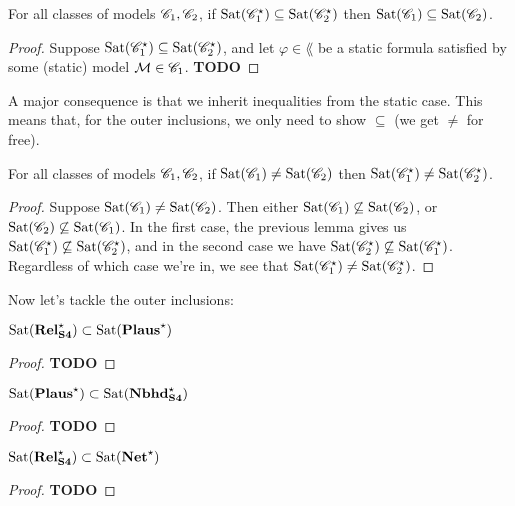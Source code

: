 \documentclass[letterpaper]{article}
\begin{document}
\begin{lemma}
    For all classes of models $\mathscr{C}_1, \mathscr{C}_2$, if $\mathrm{Sat}( \mathscr{C}_1^\star ) \subseteq \mathrm{Sat}( \mathscr{C}_2^\star )$ then $\mathrm{Sat}( \mathscr{C}_1 ) \subseteq \mathrm{Sat}( \mathscr{C}_2 )$.
\end{lemma}
\begin{proof}
    Suppose $\mathrm{Sat}( \mathscr{C}_1^\star ) \subseteq \mathrm{Sat}( \mathscr{C}_2^\star )$, and let $\varphi \in \lang$ be a static formula satisfied by some (static) model $\mathcal{M} \in \mathscr{C}_1$. \textbf{TODO}
\end{proof}

A major consequence is that we inherit inequalities from the static case.  This means that, for the outer inclusions, we only need to show $\subseteq$ (we get $\ne$ for free).

\begin{corollary}
    For all classes of models $\mathscr{C}_1, \mathscr{C}_2$, if $\mathrm{Sat}( \mathscr{C}_1 ) \ne \mathrm{Sat}( \mathscr{C}_2 )$ then $\mathrm{Sat}( \mathscr{C}_1^\star ) \ne \mathrm{Sat}( \mathscr{C}_2^\star )$.
\end{corollary}
\begin{proof}
    Suppose $\mathrm{Sat}( \mathscr{C}_1 ) \ne \mathrm{Sat}( \mathscr{C}_2 )$.  Then either $\mathrm{Sat}( \mathscr{C}_1 ) \not \subseteq \mathrm{Sat}( \mathscr{C}_2 )$, or $\mathrm{Sat}( \mathscr{C}_2 ) \not \subseteq \mathrm{Sat}( \mathscr{C}_1 )$.  In the first case, the previous lemma gives us $\mathrm{Sat}( \mathscr{C}_1^\star ) \not \subseteq \mathrm{Sat}( \mathscr{C}_2^\star )$, and in the second case we have $\mathrm{Sat}( \mathscr{C}_2^\star ) \not \subseteq \mathrm{Sat}( \mathscr{C}_1^\star )$.  Regardless of which case we're in, we see that $\mathrm{Sat}( \mathscr{C}_1^\star ) \ne \mathrm{Sat}( \mathscr{C}_2^\star )$.
\end{proof}

Now let's tackle the outer inclusions:
\begin{proposition}
    $\mathrm{Sat}( \textrm{\textbf{Rel}}_\textrm{\textbf{S4}}^\star ) \subset \mathrm{Sat}( \textrm{\textbf{Plaus}}^\star )$
\end{proposition}
\begin{proof}
    \textbf{TODO}
\end{proof}

\begin{proposition}
    $\mathrm{Sat}( \textrm{\textbf{Plaus}}^\star ) \subset \mathrm{Sat}( \textrm{\textbf{Nbhd}}_\textrm{\textbf{S4}}^\star )$
\end{proposition}
\begin{proof}
    \textbf{TODO}
\end{proof}

\begin{proposition}
    $\mathrm{Sat}( \textrm{\textbf{Rel}}_\textrm{\textbf{S4}}^\star ) \subset \mathrm{Sat}( \textrm{\textbf{Net}}^\star )$
\end{proposition}
\begin{proof}
    \textbf{TODO}
\end{proof}
\end{document}
